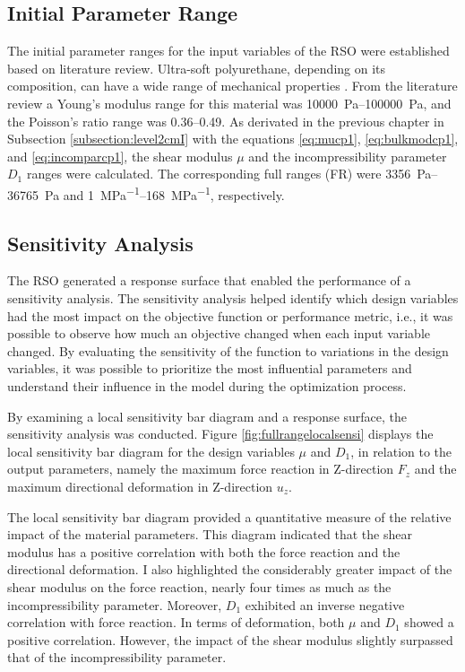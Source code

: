 \subsection*{Initial Parameter Range}
The initial parameter ranges for the input variables of the RSO were established based on literature review.
Ultra-soft polyurethane, depending on its composition, can have a wide range of mechanical properties \cite{Wendels2021}.
From the literature review a Young's modulus range for this material was \SIrange{10000}{100000}{\pascal}, and the 
Poisson's ratio range was \SIrange{0.36}{0.49}{}. As derivated in the previous chapter in 
Subsection \ref{subsection:level2cmI} with the equations \ref{eq:mucp1}, \ref{eq:bulkmodcp1}, 
and \ref{eq:incomparcp1}, the shear modulus $\mu$ and the incompressibility parameter $D_1$ ranges were calculated.
The corresponding full ranges (FR) were \SIrange{3356}{36765}{\pascal} and \SIrange{1}{168}{\mega\pascal\tothe{-1}}, respectively.

\subsection*{Sensitivity Analysis}
The RSO generated a response surface that enabled the performance of a sensitivity analysis.
The sensitivity analysis helped identify which design variables had the most impact 
on the objective function or performance metric, i.e., it was possible to observe how much 
an objective changed when each input variable changed. By evaluating the sensitivity of the 
function to variations in the design variables, it was possible to prioritize the most 
influential parameters and understand their influence in the model during the optimization 
process.

By examining a local sensitivity bar diagram and a response surface, the sensitivity analysis was conducted.
Figure \ref{fig:fullrangelocalsensi} displays the local sensitivity bar diagram for the design variables
$\mu$ and $D_1$, in relation to the output parameters, namely the maximum force reaction in Z-direction $F_z$ 
and the maximum directional deformation in Z-direction $u_z$. 

The local sensitivity bar diagram provided a quantitative measure of the relative impact of the material 
parameters. This diagram indicated that the shear modulus has a positive correlation with both the force
reaction and the directional deformation. I also highlighted the considerably greater impact of the shear modulus 
on the force reaction, nearly four times as much as the incompressibility parameter. Moreover, $D_1$ exhibited 
an inverse negative correlation with force reaction.
In terms of deformation, both $\mu$ and $D_1$ showed a positive correlation. However, the impact of the 
shear modulus slightly surpassed that of the incompressibility parameter.\\

